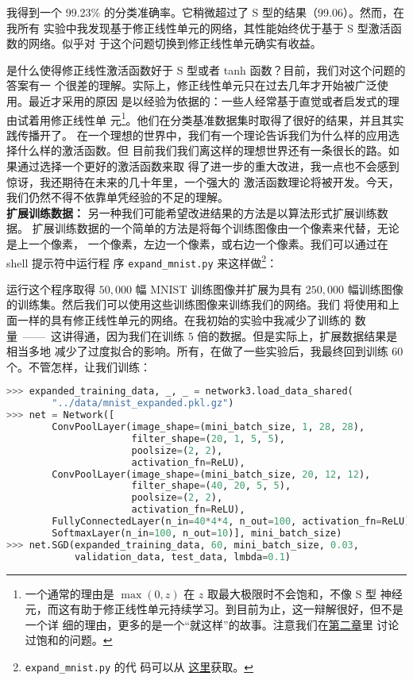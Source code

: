 我得到一个 99.23\% 的分类准确率。它稍微超过了 S 型的结果（99.06）。然而，在我所有
实验中我发现基于修正线性单元的网络，其性能始终优于基于 S 型激活函数的网络。似乎对
于这个问题切换到修正线性单元确实有收益。

是什么使得修正线性激活函数好于 S 型或者 tanh 函数？目前，我们对这个问题的答案有一
个很差的理解。实际上，修正线性单元只在过去几年才开始被广泛使用。最近才采用的原因
是以经验为依据的：一些人经常基于直觉或者启发式的理由试着用修正线性单
元\footnote{一个通常的理由是 $\max(0, z)$ 在 $z$ 取最大极限时不会饱和，不像 S 型
  神经元，而这有助于修正线性单元持续学习。到目前为止，这一辩解很好，但不是一个详
  细的理由，更多的是一个“就这样”的故事。注意我们在\hyperref[saturation]{第二章}里
  讨论过饱和的问题。}。他们在分类基准数据集时取得了很好的结果，并且其实践传播开了。
在一个理想的世界中，我们有一个理论告诉我们为什么样的应用选择什么样的激活函数。但
目前我们我们离这样的理想世界还有一条很长的路。如果通过选择一个更好的激活函数来取
得了进一步的重大改进，我一点也不会感到惊讶，我还期待在未来的几十年里，一个强大的
激活函数理论将被开发。今天，
我们仍然不得不依靠单凭经验的不足的理解。\\

\textbf{扩展训练数据：} 另一种我们可能希望改进结果的方法是以算法形式扩展训练数据。
扩展训练数据的一个简单的方法是将每个训练图像由一个像素来代替，无论是上一个像素，
一个像素，左边一个像素，或右边一个像素。我们可以通过在 shell 提示符中运行程
序 \lstinline!expand_mnist.py! 来这样做\footnote{\lstinline!expand_mnist.py! 的代
  码可以从%
  \href{https://github.com/mnielsen/neural-networks-and-deep-learning/blob/master/src/expand_mnist.py}{%
    这里}获取。}：

运行这个程序取得 $50,000$ 幅 MNIST 训练图像并扩展为具有
$250,000$ 幅训练图像的训练集。然后我们可以使用这些训练图像来训练我们的网络。我们
将使用和上面一样的具有修正线性单元的网络。在我初始的实验中我减少了训练\epochs{}的
数量~——~这讲得通，因为我们在训练 $5$ 倍的数据。但是实际上，扩展数据结果是相当多地
减少了过度拟合的影响。所有，在做了一些实验后，我最终回到训练
$60$ 个\epochs{}。不管怎样，让我们训练：
\begin{lstlisting}[language=Python]
>>> expanded_training_data, _, _ = network3.load_data_shared(
        "../data/mnist_expanded.pkl.gz")
>>> net = Network([
        ConvPoolLayer(image_shape=(mini_batch_size, 1, 28, 28), 
                      filter_shape=(20, 1, 5, 5), 
                      poolsize=(2, 2), 
                      activation_fn=ReLU),
        ConvPoolLayer(image_shape=(mini_batch_size, 20, 12, 12), 
                      filter_shape=(40, 20, 5, 5), 
                      poolsize=(2, 2), 
                      activation_fn=ReLU),
        FullyConnectedLayer(n_in=40*4*4, n_out=100, activation_fn=ReLU),
        SoftmaxLayer(n_in=100, n_out=10)], mini_batch_size)
>>> net.SGD(expanded_training_data, 60, mini_batch_size, 0.03, 
            validation_data, test_data, lmbda=0.1)
\end{lstlisting}

